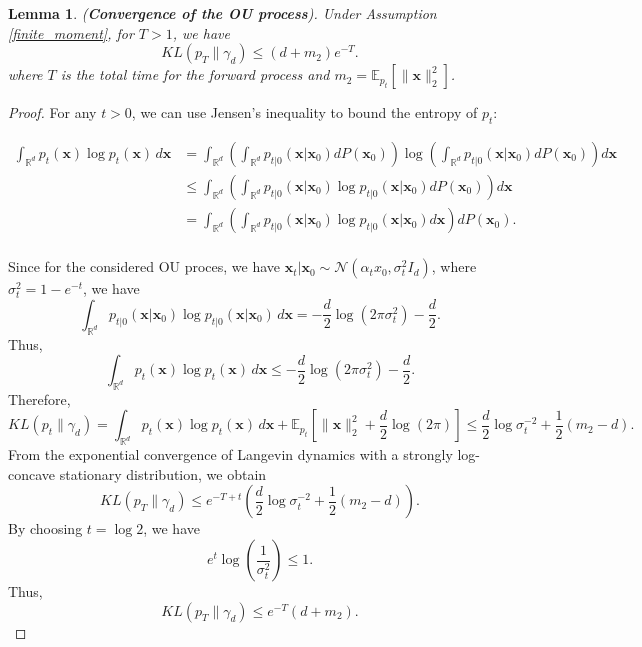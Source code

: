 \documentclass[11pt]{article}
\def\rvx{{\mathbf{x}}}
\def\vx{{\bm{x}}}
\newtheorem{lemma}{Lemma}[section]
\begin{document}
\begin{lemma}
\label{convergence_of_ou}
    (\textbf{Convergence of the OU process}). Under Assumption \ref{finite_moment}, for \( T > 1 \), we have
\[
KL(p_T \parallel \gamma_d) \leq (d + m_2) e^{-T}.
\]
where $T$ is the total time for the forward process and $m_2 = \mathbb{E}_{p_t}[\|\vx\|_2^2]$.
\end{lemma}
\begin{proof}
For any \( t > 0 \), we can use Jensen’s inequality to bound the entropy of \( p_t \):

\begin{align*}
    \int_{\mathbb{R}^d} p_t(\vx) \log p_t(\vx) \, d\vx &= \int_{\mathbb{R}^d} \left( \int_{\mathbb{R}^d} p_{t|0}(\vx|\vx_0) dP(\vx_0) \right) \log \left( \int_{\mathbb{R}^d} p_{t|0}(\vx|\vx_0) dP(\vx_0) \right) d\vx \\
&\leq \int_{\mathbb{R}^d} \left( \int_{\mathbb{R}^d} p_{t|0}(\vx|\vx_0) \log p_{t|0}(\vx|\vx_0) dP(\vx_0) \right) d\vx \\
& = \int_{\mathbb{R}^d} \left( \int_{\mathbb{R}^d} p_{t|0}(\vx|\vx_0) \log p_{t|0}(\vx|\vx_0) d\vx \right) dP(\vx_0). \\
\end{align*}

\noindent
Since for the considered OU proces, we have  \( \rvx_t | \rvx_0 \sim \mathcal{N}(\alpha_t x_0, \sigma_t^2 I_d) \), where $\sigma_t^2=1-e^{-t}$, we have
\[
\int_{\mathbb{R}^d} p_{t|0}(\vx|\vx_0) \log p_{t|0}(\vx|\vx_0) \, d\vx = -\frac{d}{2} \log(2\pi \sigma_t^2) - \frac{d}{2}.
\]
Thus,
\[
\int_{\mathbb{R}^d} p_t(\vx) \log p_t(\vx) \, d\vx \leq -\frac{d}{2} \log(2\pi \sigma_t^2) - \frac{d}{2}.
\]
Therefore,
\[
KL(p_t \parallel \gamma_d) = \int_{\mathbb{R}^d} p_t(\vx) \log p_t(\vx) \, d\vx + \mathbb{E}_{p_t} \left[ \|\vx\|^2_2 + \frac{d}{2} \log(2\pi) \right]
\leq \frac{d}{2} \log \sigma_t^{-2} + \frac{1}{2} (m_2 - d).
\]
From the exponential convergence of Langevin dynamics with a strongly log-concave stationary distribution, we obtain
\[
KL(p_T \parallel \gamma_d) \leq e^{-T + t} \left( \frac{d}{2} \log \sigma_t^{-2} + \frac{1}{2} (m_2 - d) \right).
\]
By choosing \( t = \log 2 \), we have
\[
e^t \log \left( \frac{1}{\sigma_t^2} \right) \leq 1.
\]
Thus,
\[
KL(p_T \parallel \gamma_d) \leq e^{-T} (d + m_2).
\]
\end{proof}

\noindent
\end{document}
